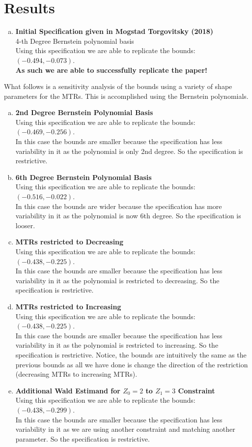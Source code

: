 \documentclass[dvip,11pt]{article}
\DeclareMathOperator{\?}{\,?\,}
\begin{document}
\section{Results}

\begin{enumerate}[a.]
	\item \textbf{Initial Specification given in Mogstad Torgovitsky (2018)}
	\\4-th Degree Bernstein polynomial basis
	\\Using this specification we are able to replicate the bounds: $(-0.494, -0.073)$.
	\\\textbf{As such we are able to successfully replicate the paper!}
\end{enumerate}
What follows is a sensitivity analysis of the bounds using a variety of shape parameters for the MTRs. This is accomplished using the Bernstein polynomials. 
\begin{enumerate}[b.]
	\item \textbf{2nd Degree Bernstein Polynomial Basis}
	\\Using this specification we are able to replicate the bounds: $(-0.469, -0.256)$.
	\\ In this case the bounds are smaller because the specification has less variability in it as the polynomial is only 2nd degree. So the specification is restrictive.
	\item \textbf{6th Degree Bernstein Polynomial Basis}
	\\Using this specification we are able to replicate the bounds: $(-0.516, -0.022)$.
	\\ In this case the bounds are wider because the specification has more variability in it as the polynomial is now 6th degree. So the specification is looser.
	\item \textbf{MTRs restricted to Decreasing}
	\\Using this specification we are able to replicate the bounds: $(-0.438, -0.225)$.
	\\ In this case the bounds are smaller because the specification has less variability in it as the polynomial is restricted to decreasing. So the specification is restrictive.
	\item \textbf{MTRs restricted to Increasing}
	\\Using this specification we are able to replicate the bounds: $(-0.438, -0.225)$.
	\\ In this case the bounds are smaller because the specification has less variability in it as the polynomial is restricted to increasing. So the specification is restrictive. Notice, the bounds are intuitively the same as the previous bounds as all we have done is change the direction of the restriction (decreasing MTRs to increasing MTRs).
	\item \textbf{Additional Wald Estimand for $Z_0 = 2 $ to $Z_1 = 3$ Constraint}
	\\Using this specification we are able to replicate the bounds: $(-0.438, -0.299)$.
	\\ In this case the bounds are smaller because the specification has less variability in it as we are using another constraint and matching another parameter. So the specification is restrictive.
\end{enumerate}
\end{document}
